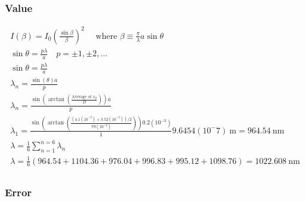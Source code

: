 \documentclass{report}
\begin{document}
\subsubsection*{Value}
$$
\begin{gathered}
I(\beta)=I_{0}\left(\frac{\sin \beta}{\beta}\right)^{2} \quad \text { where } \beta \equiv \frac{\pi}{\lambda} a \sin \theta \\
\sin \theta=\frac{p \lambda}{a} \quad p=\pm 1, \pm 2, \ldots \\
\sin \theta=\frac{p \lambda}{a}\\
\lambda_n=\frac{\sin \left(\theta\right)a}{p} \\
\lambda_n=\frac{\sin \left(\arctan \left( \frac{\text{Average of $x_p$}}{D} \right)\right)a}{p} \\
\lambda_1=\frac{\sin \left(\arctan \left( \frac{(4.1(10^{-3})+3.52(10^{-3}))/2}{79(10^{-2})} \right)\right)0.2(10^{-3})}{1} 9.6454(10^-7) \ \mathrm{m} = 964.54 \ \mathrm{nm} \\
\lambda = \frac{1}{6}\sum_{n = 1}^{n = 6} \lambda_n \\
\lambda = \frac{1}{6}{\left(964.54 + 1104.36 + 976.04 + 996.83 +  995.12 + 1098.76\right)}=1022.608 \  \mathrm{nm}\\
\end{gathered}
$$

\subsubsection*{Error}
\end{document}
